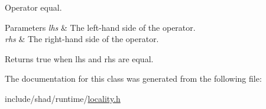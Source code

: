 Operator equal. 


\begin{DoxyParams}{Parameters}
{\em lhs} & The left-\/hand side of the operator. \\
\hline
{\em rhs} & The right-\/hand side of the operator. \\
\hline
\end{DoxyParams}
\begin{DoxyReturn}{Returns}
true when lhs and rhs are equal. 
\end{DoxyReturn}


The documentation for this class was generated from the following file\-:\begin{DoxyCompactItemize}
\item 
include/shad/runtime/\hyperlink{locality_8h}{locality.\-h}\end{DoxyCompactItemize}
